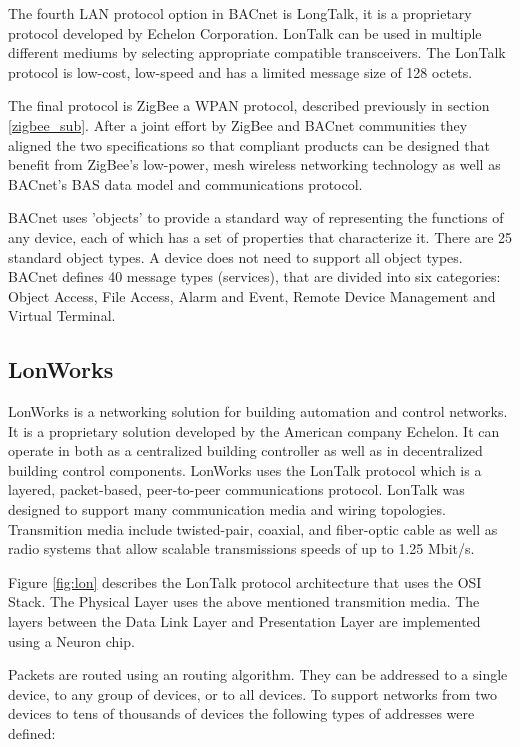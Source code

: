 The fourth \ac{LAN} protocol option in BACnet is LongTalk, it is a proprietary protocol developed by Echelon Corporation. LonTalk can be used in multiple different mediums by selecting appropriate compatible transceivers. The LonTalk protocol is low-cost, low-speed and has a limited message size of 128 octets.


The final protocol is ZigBee a \ac{WPAN} protocol, described previously in section \ref{zigbee_sub}. After a joint effort by ZigBee and BACnet communities they aligned the two specifications\cite{bacnet_zig} so that compliant products can be designed that benefit from ZigBee's low-power, mesh wireless networking technology as well as BACnet's BAS data model and communications protocol.



BACnet uses 'objects' to provide a standard way of representing the functions of any device, each of which has a set of properties that characterize it. There are 25 standard object types. A device does not need to support all object types. 
BACnet defines 40 message types (services), that are divided into six categories: Object Access, File Access, Alarm and Event, Remote Device Management and Virtual Terminal.




\subsection{LonWorks}

LonWorks \cite{livro_automation2,livro_automation} is a networking solution for building automation and control networks. It is a proprietary solution developed by the American company Echelon. It can operate in both as a centralized building controller as well as in decentralized building control components.
LonWorks uses the LonTalk protocol which is a layered, packet-based, peer-to-peer communications protocol. LonTalk was designed to support many communication media and wiring topologies. Transmition media include twisted-pair, coaxial, and fiber-optic cable as well as radio systems that allow scalable transmissions speeds of up to 1.25 Mbit/s.

Figure \ref{fig:lon} describes the  LonTalk protocol architecture that uses the OSI Stack. The Physical Layer uses the above mentioned transmition media. The layers between the Data Link Layer and Presentation Layer are implemented using a Neuron chip.

Packets are routed using an routing algorithm. They can be addressed to a single device, to any group of devices, or to all devices. To support networks from two devices to tens of thousands of devices
the following types of addresses were defined:

